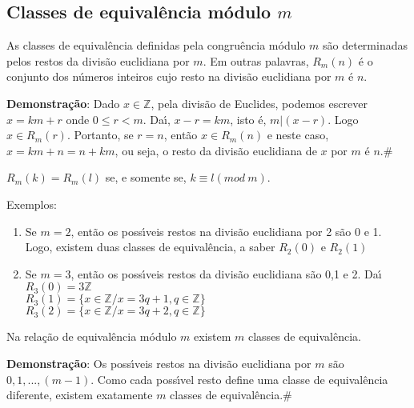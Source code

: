 \subsection{Classes de equival{\^e}ncia m{\'o}dulo $m$}

\begin{proposicao} As classes de equival{\^e}ncia definidas pela congru{\^e}ncia m{\'o}dulo $m$ s{\~a}o determinadas pelos restos da divis{\~a}o euclidiana por $m$. Em outras palavras, $R_{m}(n)$ {\'e} o conjunto dos n{\'u}meros inteiros cujo resto na divis{\~a}o euclidiana por $m$ {\'e} $n$.\end{proposicao}

\textbf{Demonstra{\c c}{\~a}o}: Dado $x\in\mathbb{Z}$, pela divis{\~a}o de Euclides, podemos escrever $x=km+r$ onde $0\leq r < m$. Da{\'\i}, $x-r=km$, isto {\'e}, $m|(x-r)$. Logo $x\in R_{m}(r)$. Portanto, se $r=n$, ent{\~a}o $x\in R_{m}(n)$ e neste caso, $x=km+n=n+km$, ou seja, o resto da divis{\~a}o euclidiana de $x$ por $m$ {\'e} $n$.\#  

\begin{corolario} $R_{m}(k)=R_{m}(l)$ se, e somente se, $k\equiv l(mod\ m)$.\end{corolario}

Exemplos:
\begin{enumerate}
\item Se $m=2$, ent{\~a}o os poss{\'\i}veis restos na divis{\~a}o euclidiana por 2 s{\~a}o 0 e 1. Logo, existem duas classes de equival{\^e}ncia, a saber $R_{2}(0)$ e $R_{2}(1)$
\item Se $m=3$, ent{\~a}o os poss{\'\i}veis restos da divis{\~a}o euclidiana s{\~a}o 0,1 e 2. Da{\'\i}\\
$R_{3}(0)=3\mathbb{Z}$\\
$R_{3}(1)=\{x\in\mathbb{Z}/x=3q+1,q\in\mathbb{Z}\}$\\
$R_{3}(2)=\{x\in\mathbb{Z}/x=3q+2,q\in\mathbb{Z}\}$

\end{enumerate}

\begin{proposicao} Na rela{\c c}{\~a}o de equival{\^e}ncia m{\'o}dulo $m$ existem $m$ classes de equival{\^e}ncia.\end{proposicao}

\textbf{Demonstra{\c c}{\~a}o}: Os poss{\'\i}veis restos na divis{\~a}o euclidiana por $m$ s{\~a}o $0,1,...,(m-1)$. Como cada poss{\'\i}vel resto define uma classe de equival{\^e}ncia diferente, existem exatamente $m$ classes de equival{\^e}ncia.\#

